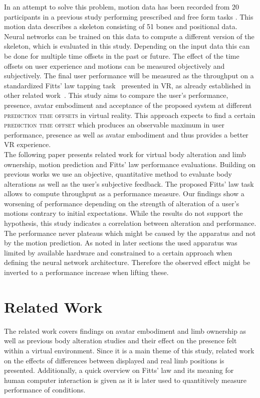 \documentclass[sigconf]{acmart}
\begin{document}
In an attempt to solve this problem, motion data has been recorded from 20 participants in a previous study performing prescribed and free form tasks .
This motion data describes a skeleton consisting of 51 bones and positional data. 
Neural networks can be trained on this data to compute a different version of the skeleton, which is evaluated in this study.
Depending on the input data this can be done for multiple time offsets in the past or future.
The effect of the time offsets on user experience and motions can be measured objectively and subjectively.
The final user performance will be measured as the throughput on a standardized Fitts' law tapping task~\cite{A2004} presented in VR, as already established in other related work~\cite{Schwind2019a}. 
This study aims to compare the user's performance, presence, avatar embodiment and acceptance of the proposed system at different \textsc{prediction time offsets} in virtual reality.
This approach expects to find a certain \textsc{prediction time offset} which produces an observable maximum in user performance, presence as well as avatar embodiment and thus provides a better VR experience.\\ 

The following paper presents related work for virtual body alteration and limb ownership, motion prediction and Fitts' law performance evaluations. Building on previous works we use an objective, quantitative method to evaluate body alterations as well as the user's subjective feedback. The proposed Fitts' law task allows to compute throughput as a performance measure. Our findings show a worsening of performance depending on the strength of alteration of a user's motions contrary to initial expectations. While the results do not support the hypothesis, this study indicates a correlation between alteration and performance. The performance never plateaus which might be caused by the apparatus and not by the motion prediction. As noted in later sections the used apparatus was limited by available hardware and constrained to a certain approach when defining the neural network architecture. Therefore the observed effect might be inverted to a performance increase when lifting these.

\section{Related Work}\label{tit:RelatedWork}
The related work covers findings on avatar embodiment and limb ownership as well as previous body alteration studies and their effect on the presence felt within a virtual environment. 
Since it is a main theme of this study, related work on the effects of differences between displayed and real limb positions is presented. 
Additionally, a quick overview on Fitts' law and its meaning for human computer interaction is given as it is later used to quantitively measure performance of conditions.
\end{document}
